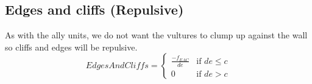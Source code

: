 	\subsection*{Edges and cliffs (Repulsive)}
		As with the ally units, we do not want the vultures to clump up against the wall so cliffs and edges will be repulsive.
		\begin{displaymath}
			EdgesAndCliffs = \begin{cases}
					\frac{-f_{EAC}}{de} & \text{if } de \leq c\\
					0 & \text{if } de > c
				\end{cases}		
		\end{displaymath}
	
	